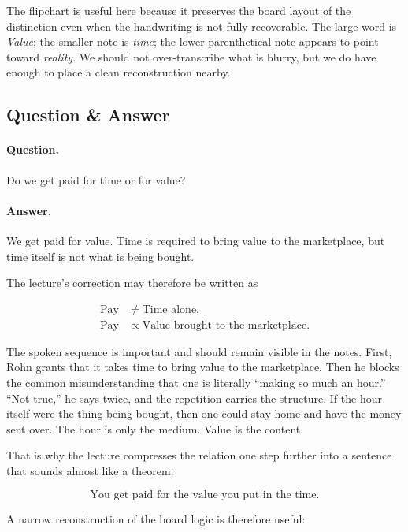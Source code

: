 The flipchart is useful here because it preserves the board layout of the distinction even when the handwriting is not fully recoverable. The large word is \emph{Value}; the smaller note is \emph{time}; the lower parenthetical note appears to point toward \emph{reality}. We should not over-transcribe what is blurry, but we do have enough to place a clean reconstruction nearby.

\subsection{Question \& Answer}

\paragraph{Question.} Do we get paid for time or for value?

\paragraph{Answer.} We get paid for value. Time is required to bring value to the marketplace, but time itself is not what is being bought.

The lecture's correction may therefore be written as

\begin{align}
\text{Pay} &\neq \text{Time alone},\\
\text{Pay} &\propto \text{Value brought to the marketplace}.
\end{align}

The spoken sequence is important and should remain visible in the notes. First, Rohn grants that it takes time to bring value to the marketplace. Then he blocks the common misunderstanding that one is literally ``making so much an hour.'' ``Not true,'' he says twice, and the repetition carries the structure. If the hour itself were the thing being bought, then one could stay home and have the money sent over. The hour is only the medium. Value is the content.

That is why the lecture compresses the relation one step further into a sentence that sounds almost like a theorem:

\begin{equation}
\text{You get paid for the value you put in the time}.
\end{equation}

A narrow reconstruction of the board logic is therefore useful:

